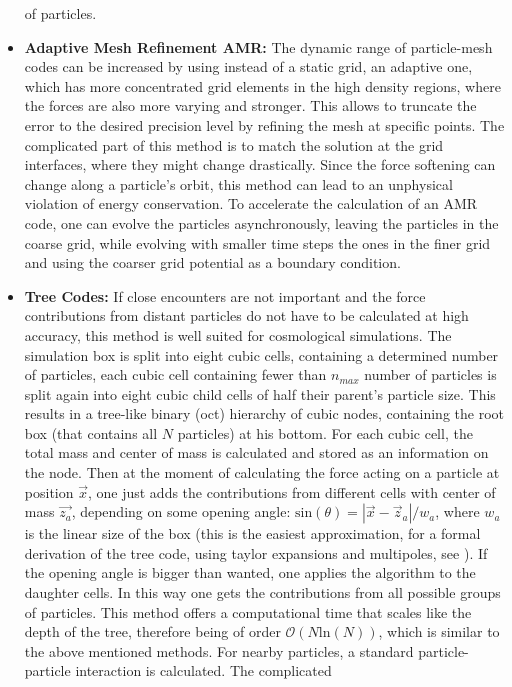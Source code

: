 \begin{itemize}
of particles.
\item \textbf{Adaptive Mesh Refinement AMR: }The dynamic range of particle-mesh
codes can be increased by using instead of a static grid, an adaptive
one, which has more concentrated grid elements in the high density
regions, where the forces are also more varying and stronger. This
allows to truncate the error to the desired precision level by refining
the mesh at specific points. The complicated part of this method is
to match the solution at the grid interfaces, where they might change
drastically. Since the force softening can change along a particle's
orbit, this method can lead to an unphysical violation of energy conservation.
To accelerate the calculation of an AMR code, one can evolve the particles
asynchronously, leaving the particles in the coarse grid, while evolving
with smaller time steps the ones in the finer grid and using the coarser
grid potential as a boundary condition.
\item \textbf{Tree Codes: }If close encounters are not important and the
force contributions from distant particles do not have to be calculated
at high accuracy, this method is well suited for cosmological simulations.
The simulation box is split into eight cubic cells, containing a determined
number of particles, each cubic cell containing fewer than $n_{max}$
number of particles is split again into eight cubic child cells of
half their parent's particle size. This results in a tree-like binary
(oct) hierarchy of cubic nodes, containing the root box (that contains
all $N$ particles) at his bottom. For each cubic cell, the total
mass and center of mass is calculated and stored as an information
on the node. Then at the moment of calculating the force acting on
a particle at position $\vec{x}$, one just adds the contributions
from different cells with center of mass $\vec{z_{a}}$, depending
on some opening angle: $\mbox{sin}(\theta)=\left|\vec{x}-\vec{z}_{a}\right|/w_{a}$,
where $w_{a}$ is the linear size of the box (this is the easiest
approximation, for a formal derivation of the tree code, using taylor
expansions and multipoles, see \citet{dehnen_n-body_2011}). If the
opening angle is bigger than wanted, one applies the algorithm to
the daughter cells. In this way one gets the contributions from all
possible groups of particles. This method offers a computational time
that scales like the depth of the tree, therefore being of order $\mathcal{O}(N\mbox{ln}(N))$,
which is similar to the above mentioned methods. For nearby particles,
a standard particle-particle interaction is calculated. The complicated

\end{itemize}
